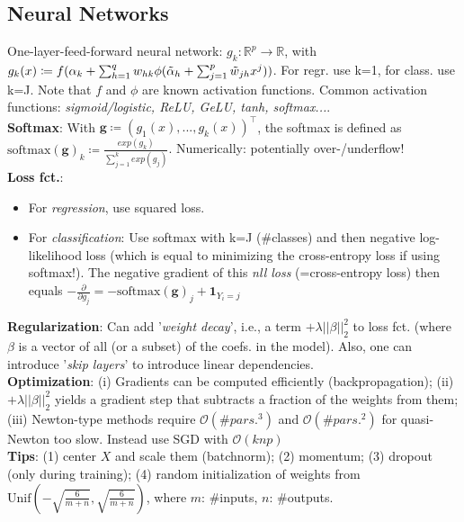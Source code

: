 \subsection*{Neural Networks}
One-layer-feed-forward neural network: $g_k: \mathbb{R}^p \to \mathbb{R}$, with \\
$g_k(x) \coloneqq f(\alpha_k + \sum_{h=1}^q w_{hk} \phi(\Tilde{\alpha}_h + \sum_{j=1}^p \Tilde{w}_{jh} x^j))$. For regr. use k=1, for class. use k=J. Note that $f$ and $\phi$ are known activation functions. Common activation functions: \emph{sigmoid/logistic, ReLU, GeLU, tanh, softmax...}.  \\
\textbf{Softmax}: With $\mathbf{g} \coloneqq (g_1(x), ..., g_k(x))^\intercal$, the softmax is defined as \\
$\text{softmax}(\mathbf{g})_k \coloneqq \frac{exp(g_k)}{\sum_{j=1}^k exp(g_j)}$. Numerically: potentially over-/underflow! \\
\textbf{Loss fct.}: 
\begin{itemize}
    \item For \emph{regression}, use squared loss.
    \item For \emph{classification}: Use softmax with k=J (\#classes) and then negative log-likelihood loss (which is equal to minimizing the cross-entropy loss if using softmax!). The negative gradient of this \emph{nll loss} (=cross-entropy loss) then equals $-\frac{\partial}{\partial g_j} = -\text{softmax}(\mathbf{g})_j + \mathbf{1}_{Y_i=j}$
\end{itemize}
\textbf{Regularization}: Can add '\emph{weight decay}', i.e., a term $+\lambda||\beta||_2^2$ to loss fct. (where $\beta$ is a vector of all (or a subset) of the coefs. in the model). Also, one can introduce '\emph{skip layers}' to introduce linear dependencies. \\
\textbf{Optimization}: (i) Gradients can be computed efficiently (backpropagation); (ii) $+\lambda||\beta||^2_2$ yields a gradient step that subtracts a fraction of the weights from them; (iii) Newton-type methods require $\mathcal{O}(\#pars.^3)$ and $\mathcal{O}(\#pars.^2)$ for quasi-Newton \textrightarrow too slow. Instead use SGD with $\mathcal{O}(knp)$ \\
\textbf{Tips}: (1) center $X$ and scale them (batchnorm); (2) momentum; (3) dropout (only during training); (4) random initialization of weights from $\text{Unif}\left(-\sqrt{\frac{6}{m+n}}, \sqrt{\frac{6}{m+n}}\right)$, where $m$: \#inputs, $n$: \#outputs. \\

